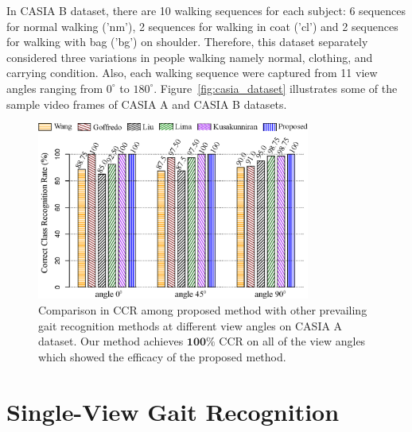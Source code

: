 \begin{itemize}
	In CASIA B dataset, there are 10 walking sequences for each subject: 6 sequences for normal walking ('nm'), 2 sequences for walking in coat ('cl') and 2 sequences for walking with bag ('bg') on shoulder. Therefore, this dataset separately considered three variations in people walking namely normal, clothing, and carrying condition. Also, each walking sequence were captured from 11 view angles ranging from ${0^{\circ}}$ to ${180^{\circ}}$. Figure~\ref{fig:casia_dataset} illustrates some of the sample video frames of CASIA A and CASIA B datasets.
\end{itemize}



\begin{figure}
	\centering
	\includegraphics[width = 0.8\textwidth]{figures/casia_a_result.eps}
	\caption [Comparison in CCR among proposed method with other prevailing gait recognition methods at different view angles on CASIA A dataset]
	{Comparison in CCR among proposed method with other prevailing gait recognition methods at different view angles on CASIA A dataset. Our method achieves $ \textbf{100\% }$ CCR on all of the view angles which showed the efficacy of the proposed method. \label{fig:casia_a_result}
	}
	
\end{figure}

\section{Single-View Gait Recognition} \label{sec:single_view}
